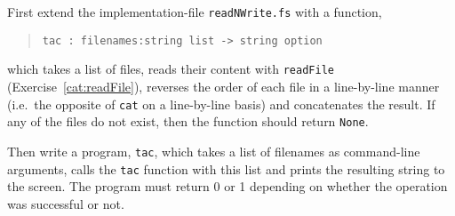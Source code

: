 First extend the implementation-file \lstinline{readNWrite.fs} with a function,
\begin{quote}
  \mbox{\lstinline!tac : filenames:string list -> string option!}
\end{quote}
which takes a list of files, reads their content with \lstinline{readFile} (Exercise~\ref{cat:readFile}), reverses the order of each file in a line-by-line manner (i.e.\ the opposite of \lstinline{cat} on a line-by-line basis) and concatenates the result.  If any of the files do not exist, then the function should return \lstinline{None}.

Then write a program, \lstinline[language=console]{tac}, which takes a list of filenames as command-line arguments, calls the \lstinline{tac} function with this list and prints the resulting string to the screen. The program must return 0 or 1 depending on whether the operation was successful or not.
